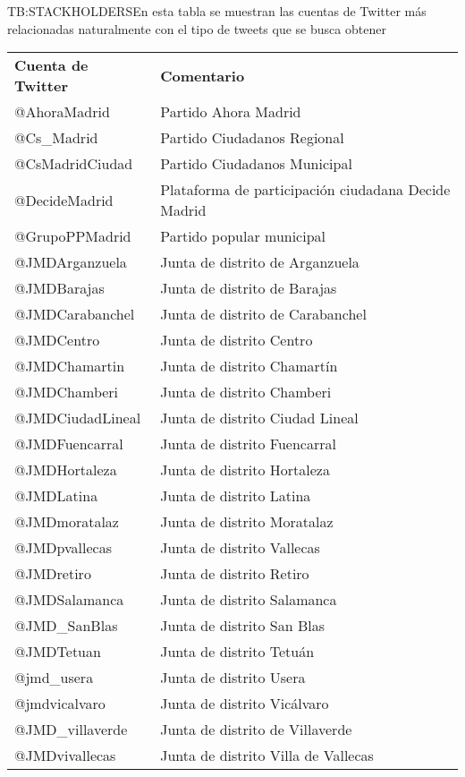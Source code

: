 \begin{table}[Stackholders utilizados para las extracciones]{TB:STACKHOLDERS}{En esta tabla se muestran las cuentas de Twitter más relacionadas naturalmente con el tipo de tweets que se busca obtener}
		\begin{tabular}{|p{4cm}|p{8cm}|}
			\hline
			\textbf{Cuenta de Twitter} & \textbf{Comentario} \\
			@AhoraMadrid & Partido Ahora Madrid\\
			@Cs\_Madrid & Partido Ciudadanos Regional\\
			@CsMadridCiudad & Partido Ciudadanos Municipal\\
			@DecideMadrid & Plataforma de participación ciudadana Decide Madrid \\
			@GrupoPPMadrid & Partido popular municipal \\
			@JMDArganzuela & Junta de distrito de Arganzuela\\
			@JMDBarajas & Junta de distrito de Barajas\\
			@JMDCarabanchel & Junta de distrito de Carabanchel\\
			@JMDCentro & Junta de distrito Centro\\
			@JMDChamartin & Junta de distrito Chamartín \\
			@JMDChamberi & Junta de distrito Chamberi\\
			@JMDCiudadLineal & Junta de distrito Ciudad Lineal \\
			@JMDFuencarral & Junta de distrito Fuencarral\\
			@JMDHortaleza & Junta de distrito Hortaleza \\
			@JMDLatina & Junta de distrito Latina\\
			@JMDmoratalaz & Junta de distrito Moratalaz\\
			@JMDpvallecas & Junta de distrito Vallecas\\
			@JMDretiro & Junta de distrito Retiro\\
			@JMDSalamanca & Junta de distrito Salamanca\\
			@JMD\_SanBlas & Junta de distrito San Blas \\
			@JMDTetuan & Junta de distrito Tetuán \\
			@jmd\_usera & Junta de distrito Usera\\
			@jmdvicalvaro & Junta de distrito Vicálvaro\\
			@JMD\_villaverde & Junta de distrito de Villaverde\\
			@JMDvivallecas & Junta de distrito Villa de Vallecas\\

\end{tabular}
\end{table}
